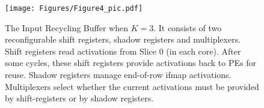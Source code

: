 \begin{figure}
\texttt{[image: Figures/Figure4\_pic.pdf]}
\centering
\caption{The Input Recycling Buffer when $K=3$. It consists of two reconfigurable shift registers, shadow registers and multiplexers. Shift registers read activations from Slice 0 (in each core). After some cycles, these shift registers provide activations back to PEs for reuse. Shadow registers manage end-of-row ifmap activations. Multiplexers select whether the current activations must be provided by shift-registers or by shadow registers. 
}
\label{IRB}
\end{figure}